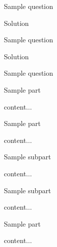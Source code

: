 \documentclass[12pt]{article} %
\begin{document}
\begin{qstn}[8][][]
	Sample question
\begin{soln}
	Solution
\end{soln}
\end{qstn}

\begin{qstn}[9][][]
	Sample question
\begin{soln}
	Solution
\end{soln}
\end{qstn}

\begin{qstn}[10][][]
	Sample question
\begin{assgnenum}
	\qitem Sample part
	\begin{soln}
		content...
	\end{soln}
	\qitem Sample part
	\begin{soln}
		content...
	\end{soln}
	\begin{assgnenum}
		\qitem Sample subpart
		\begin{soln}
			content...
		\end{soln}
		\qitem Sample subpart
		\begin{soln}
			content...
		\end{soln}
	\end{assgnenum}
	\qitem Sample part
	\begin{soln}
		content...
	\end{soln}
\end{assgnenum}
\end{qstn}
\end{document}
